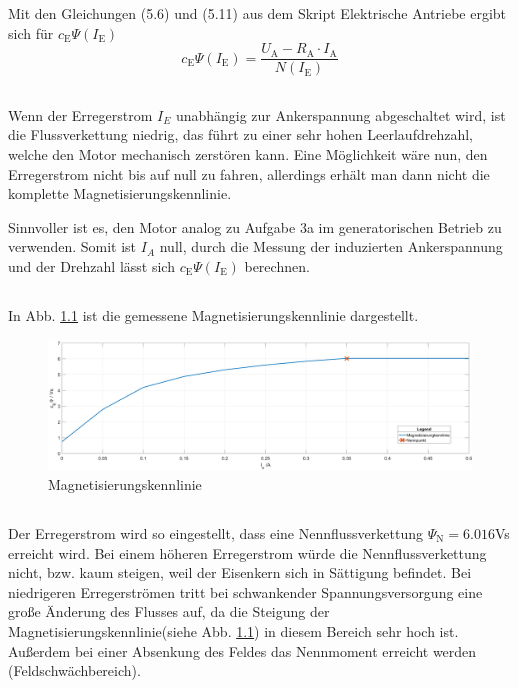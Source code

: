 \chapter{}\label{ex:aufg4}
%
\section{}\label{sec:aufg4a}
Mit den Gleichungen (5.6) und (5.11) aus dem Skript Elektrische Antriebe ergibt sich für $c_\text{E}\Psi(I_\text{E})$
\begin{equation}
c_\text{E}\Psi(I_\text{E}) = \frac{U_\text{A} - R_\text{A} \cdot I_\text{A}}{N(I_\text{E})}
\end{equation}
\section{}\label{sec:aufg4b}
Wenn der Erregerstrom $I_E$ unabhängig zur Ankerspannung abgeschaltet wird, ist die Flussverkettung niedrig, das führt zu einer sehr hohen Leerlaufdrehzahl, welche den Motor mechanisch zerstören kann. Eine Möglichkeit wäre nun, den Erregerstrom nicht bis auf null zu fahren, allerdings erhält man dann nicht die komplette Magnetisierungskennlinie.

Sinnvoller ist es, den Motor analog zu Aufgabe 3a im generatorischen Betrieb zu verwenden. Somit ist $I_A$ null, durch die Messung der induzierten Ankerspannung und der Drehzahl lässt sich $c_\text{E}\Psi(I_\text{E})$ berechnen.

\section{}\label{sec:aufg4c}
%
In Abb. \ref{fig:magnet} ist die gemessene Magnetisierungskennlinie dargestellt.
\begin{figure}[htb]

\includegraphics[width=1\textwidth]{./Bilder/magentisierungkennlinie_1}
\caption{Magnetisierungskennlinie}
\label{fig:magnet}
\end{figure}
%
\section{}\label{sec:aufg4_d}
%
Der Erregerstrom wird so eingestellt, dass eine Nennflussverkettung $\Psi_\text{N} = 6.016$Vs erreicht wird. Bei einem höheren Erregerstrom würde die Nennflussverkettung nicht, bzw. kaum steigen, weil der Eisenkern sich in Sättigung befindet. Bei niedrigeren Erregerströmen tritt bei schwankender Spannungsversorgung eine große Änderung des Flusses auf, da die Steigung der Magnetisierungskennlinie(siehe Abb. \ref{fig:magnet}) in diesem Bereich sehr hoch ist. Außerdem bei einer Absenkung des Feldes das Nennmoment erreicht werden (Feldschwächbereich).
%
\clearpage